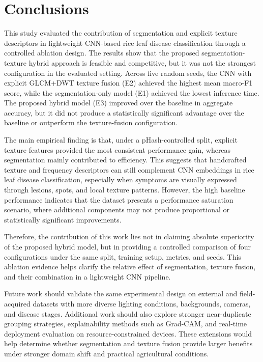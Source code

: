 \section{Conclusions}

This study evaluated the contribution of segmentation and explicit texture descriptors in lightweight CNN-based rice leaf disease classification through a controlled ablation design. The results show that the proposed segmentation-texture hybrid approach is feasible and competitive, but it was not the strongest configuration in the evaluated setting. Across five random seeds, the CNN with explicit GLCM+DWT texture fusion (E2) achieved the highest mean macro-F1 score, while the segmentation-only model (E1) achieved the lowest inference time. The proposed hybrid model (E3) improved over the baseline in aggregate accuracy, but it did not produce a statistically significant advantage over the baseline or outperform the texture-fusion configuration.

The main empirical finding is that, under a pHash-controlled split, explicit texture features provided the most consistent performance gain, whereas segmentation mainly contributed to efficiency. This suggests that handcrafted texture and frequency descriptors can still complement CNN embeddings in rice leaf disease classification, especially when symptoms are visually expressed through lesions, spots, and local texture patterns. However, the high baseline performance indicates that the dataset presents a performance saturation scenario, where additional components may not produce proportional or statistically significant improvements.

Therefore, the contribution of this work lies not in claiming absolute superiority of the proposed hybrid model, but in providing a controlled comparison of four configurations under the same split, training setup, metrics, and seeds. This ablation evidence helps clarify the relative effect of segmentation, texture fusion, and their combination in a lightweight CNN pipeline.

Future work should validate the same experimental design on external and field-acquired datasets with more diverse lighting conditions, backgrounds, cameras, and disease stages. Additional work should also explore stronger near-duplicate grouping strategies, explainability methods such as Grad-CAM, and real-time deployment evaluation on resource-constrained devices. These extensions would help determine whether segmentation and texture fusion provide larger benefits under stronger domain shift and practical agricultural conditions.
